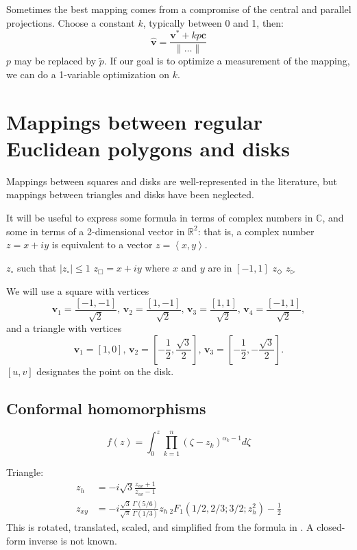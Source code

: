 \documentclass{amsart}[12pt]
\begin{document}
Sometimes the best mapping comes from a compromise of the central and
parallel projections. Choose a constant $k$, typically between 0 and 1, then:
\begin{equation}
  \hat{\mathbf v} = \frac{\mathbf v^* + kp\mathbf c}{\|\dots\|}
\end{equation}
$p$ may be replaced by $\widetilde{p}$. If our goal is to optimize a
measurement of the mapping, we can do a 1-variable optimization on $k$.

\section{Mappings between regular Euclidean polygons and disks}
Mappings between squares
and disks are well-represented in the literature, but mappings between
triangles and disks have been neglected.
\cite{fong15}\cite{fong16}\cite{fong18}\cite{lambers}

It will be useful to express some formula in terms of complex numbers in
$\mathbb{C}$, and some in terms of a 2-dimensional vector in $\mathbb{R}^2$:
that is, a complex number $z = x + i y$ is equivalent to a vector
$z = \left<x, y \right>$.

$z_\circ$ such that $|z_\circ| \le 1$
$z_\Box = x + i y$ where $x$ and $y$ are in $[-1,1]$
$z_\Diamond$
$z_\rhd$

We will use a square with vertices
\begin{equation}
  \mathbf{v}_1 = \frac{[-1,-1]}{\sqrt 2}, \,
  \mathbf{v}_2 = \frac{[1,-1]}{\sqrt 2}, \,
  \mathbf{v}_3 = \frac{[1,1]}{\sqrt 2}, \,
  \mathbf{v}_4 = \frac{[-1,1]}{\sqrt 2},
\end{equation}
and a triangle with vertices
\begin{equation}
  \mathbf{v}_1 = \left[1, 0\right], \,
  \mathbf{v}_2 = \left[-\frac{1}{2}, \frac{\sqrt{3}}{2}\right], \,
  \mathbf{v}_3 = \left[-\frac{1}{2}, -\frac{\sqrt{3}}{2}\right].
\end{equation}
$[u, v]$ designates the point on the disk.

\subsection{Conformal homomorphisms}
\begin{equation}
f(z) = \int_0^z \prod_{k=1}^n (\zeta - z_k)^{\alpha_k-1} d\zeta
\end{equation}

Triangle:
\begin{equation}\begin{split}
  z_h &= -i \sqrt{3} \frac{z_{uv}+1}{z_{uv}-1} \\
  z_{xy} &= -i
  \frac{\sqrt{3}}{\sqrt{\pi}}
  \frac{ \Gamma\left({5/6}\right) }
  { \Gamma\left({1/3}\right) }
  z_h\, {}_2 F_1 \left(1/2,2/3;3/2;z_h^2\right)
  -\frac{1}{2}
\end{split}\end{equation}
This is rotated, translated, scaled, and simplified from the formula in
\cite{mathews}. A closed-form inverse is not known.
\end{document}
